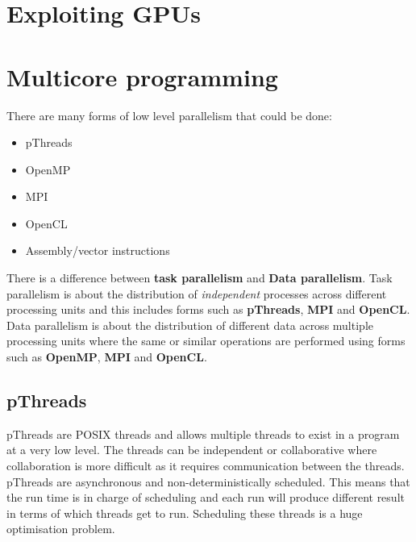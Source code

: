 \documentclass[11pt]{article}
\begin{document}
\section{Exploiting GPUs}

\section{Multicore programming}
There are many forms of low level parallelism that could be done:
\begin{itemize}
\item pThreads
\item OpenMP
\item MPI
\item OpenCL
\item Assembly/vector instructions
\end{itemize}
There is a difference between \textbf{task parallelism} and \textbf{Data parallelism}. Task parallelism is about the distribution of \textit{independent} processes across different processing units and this includes forms such as \textbf{pThreads}, \textbf{MPI} and \textbf{OpenCL}. Data parallelism is about the distribution of different data across multiple processing units where the same or similar operations are performed using forms such as \textbf{OpenMP}, \textbf{MPI} and \textbf{OpenCL}.

\subsection{pThreads}
pThreads are POSIX threads and allows multiple threads to exist in a program at a very low level. The threads can be independent or collaborative where collaboration is more difficult as it requires communication between the threads.
\n
pThreads are asynchronous and non-deterministically scheduled. This means that the run time is in charge of scheduling and each run will produce different result in terms of which threads get to run. Scheduling these threads is a huge optimisation problem. 
\end{document}
